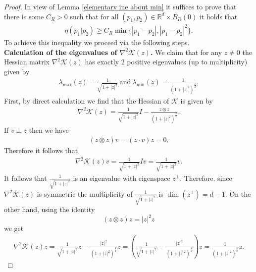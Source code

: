 \documentclass[11pt,reqno]{amsart}
\numberwithin{equation}{section}
\begin{document}
\begin{proof}
In view of Lemma \ref{elementary ine about min} it suffices to prove that there is some $C_{R}>0$ such that for all $(p_{1},p_{2})\in \mathbb{R}^{d}\times B_{R}(0)$ it holds that 
\begin{align}
\eta(p_{1}\vert p_{2})\geq C_{R}\min\{\left\vert p_{1}-p_{2}\right\vert ,\left\vert p_{1}-p_{2}\right\vert^{2} \}. \label{eta requested inequality}   \end{align}
To achieve this inequality we proceed via the following steps. \\
\textbf{Calculation of the eigenvalues of $\nabla^{2}\mathscr{K}(z)$.} We claim that for any $z\neq 0$ the Hessian matrix $\nabla^{2}\mathscr{K}(z)$ has exactly $2$ positive eigenvalues (up to multiplicity) given by 
\begin{align}
\lambda_{\max}(z)=\frac{1}{\sqrt{1+\left\vert z\right\vert^{2}}} \ \mbox{and}\ \lambda_{\min}(z)=\frac{1}{(1+\left\vert z\right\vert^{2})^{\frac{3}{2}}}. \label{formula for eigenvalues}    
\end{align}
First, by direct calculation we find that the Hessian of $\mathscr{K}$ is given by 
\begin{align*}
\nabla^{2}\mathscr{K}(z)=\frac{1}{\sqrt{1+\left\vert z\right\vert^{2} }}I-\frac{z\otimes z}{(1+\left\vert z\right\vert^{2})^{\frac{3}{2}}}.     
\end{align*}
If $v\perp z$ then we have 
\begin{align*}
(z\otimes z)v=(z\cdot v)z=0.   
\end{align*}
Therefore it follows that 
\begin{align*}
\nabla^{2}\mathscr{K}(z)v=\frac{1}{\sqrt{1+\left\vert z\right\vert^{2}}}Iv=\frac{1}{\sqrt{1+\left\vert z\right\vert^{2}}}v.
\end{align*}
It follows that $\frac{1}{\sqrt{1+\left\vert z\right\vert^{2}}}$ is an eigenvalue with eigenspace $z^{\perp}$. Therefore, since $\nabla^{2}\mathscr{K}(z)$ is symmetric the multiplicity of $\frac{1}{\sqrt{1+\left\vert z\right\vert^{2}}}$ is $\dim(z^{\perp})=d-1$. On the other hand, using the identity $$(z\otimes z)z=\left\vert z\right\vert^{2}z$$ we get  
\begin{align*}
\nabla^{2}\mathscr{K}(z)z=\frac{1}{\sqrt{1+\left\vert z\right\vert^{2} }}z-\frac{\left\vert z\right\vert^{2} }{(1+\left\vert z\right\vert^{2} )^{\frac{3}{2}}}z=\left(\frac{1}{\sqrt{1+\left\vert z\right\vert^{2}}}-\frac{\left\vert z\right\vert^{2}}{(1+\left\vert z\right\vert^{2} )^{\frac{3}{2}}}\right)z=\frac{1}{(1+\left\vert z\right\vert^{2})^{\frac{3}{2}}}z.    

\end{align*}
\end{proof}
\end{document}
